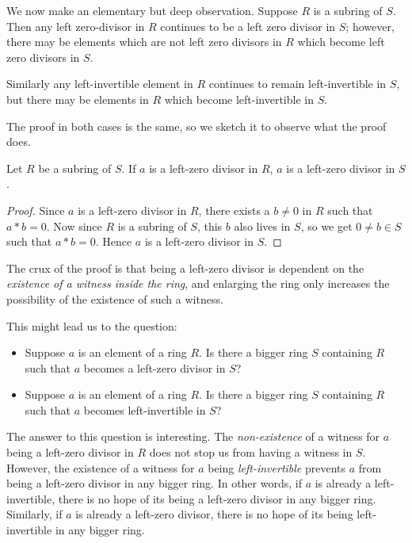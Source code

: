 \documentclass[a4paper]{amsart}
\begin{document}
We now make an elementary but deep observation. Suppose $R$ is a
subring of $S$. Then any left zero-divisor in $R$ continues to be a
left zero divisor in $S$; however, there may be elements which are not
left zero divisors in $R$ which become left zero divisors in $S$.

Similarly any left-invertible element in $R$ continues to remain
left-invertible in $S$, but there may be elements in $R$ which become
left-invertible in $S$.

The proof in both cases is the same, so we sketch it to observe what
the proof does.

\begin{claimer}
  Let $R$ be a subring of $S$. If $a$ is a left-zero divisor in $R$,
  $a$ is a left-zero divisor in $S$.
\end{claimer}

\begin{proof}
  Since $a$ is a left-zero divisor in $R$, there exists a $b \ne 0$ in
  $R$ such that $a * b= 0$. Now since $R$ is a subring of $S$, this
  $b$ also lives in $S$, so we get $0 \ne b \in S$ such that $a * b =
  0$. Hence $a$ is a left-zero divisor in $S$.
\end{proof}

The crux of the proof is that being a left-zero divisor is dependent
on the {\em existence of a witness inside the ring}, and enlarging the
ring only increases the possibility of the existence of such a
witness.

This might lead us to the question:

\begin{itemize}

\item Suppose $a$ is an element of a ring $R$. Is there a bigger ring
  $S$ containing $R$ such that $a$ becomes a left-zero divisor in $S$?

\item Suppose $a$ is an element of a ring $R$. Is there a bigger ring
  $S$ containing $R$ such that $a$ becomes left-invertible in $S$?

\end{itemize}

The answer to this question is interesting. The {\em non-existence} of
a witness for $a$ being a left-zero divisor in $R$ does not stop us
from having a witness in $S$. However, the existence of a witness for
$a$ being {\em left-invertible} prevents $a$ from being a left-zero
divisor in any bigger ring. In other words, if $a$ is already a
left-invertible, there is no hope of its being a left-zero divisor in
any bigger ring. Similarly, if $a$ is already a left-zero divisor,
there is no hope of its being left-invertible in any bigger ring.
\end{document}
